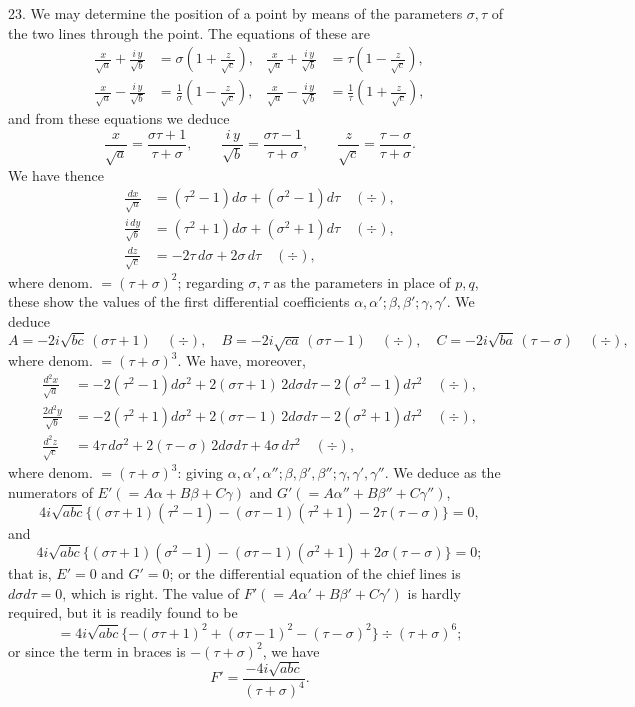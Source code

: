 \documentclass[11pt,a4paper]{article}
\newcommand{\divmark}{\quad(\div)}
\begin{document}
23. We may determine the position of a point by means of the parameters $\sigma,\tau$
of the two lines through the point. The equations of these are
\[
\begin{aligned}
 \frac{x}{\sqrt a}+\frac{i\,y}{\sqrt b}
 &=\sigma\left(1+\frac{z}{\sqrt c}\right),&
 \frac{x}{\sqrt a}+\frac{i\,y}{\sqrt b}
 &=\tau\left(1-\frac{z}{\sqrt c}\right),\\
 \frac{x}{\sqrt a}-\frac{i\,y}{\sqrt b}
 &=\frac{1}{\sigma}\left(1-\frac{z}{\sqrt c}\right),&
 \frac{x}{\sqrt a}-\frac{i\,y}{\sqrt b}
 &=\frac{1}{\tau}\left(1+\frac{z}{\sqrt c}\right),
\end{aligned}
\]
and from these equations we deduce
\[
 \frac{x}{\sqrt a}=\frac{\sigma\tau+1}{\tau+\sigma},\qquad
 \frac{i\,y}{\sqrt b}=\frac{\sigma\tau-1}{\tau+\sigma},\qquad
 \frac{z}{\sqrt c}=\frac{\tau-\sigma}{\tau+\sigma}.
\]
We have thence
\[
\begin{aligned}
 \frac{dx}{\sqrt a}&=(\tau^2-1)d\sigma+(\sigma^2-1)d\tau \divmark,\\
 \frac{i\,dy}{\sqrt b}&=(\tau^2+1)d\sigma+(\sigma^2+1)d\tau \divmark,\\
 \frac{dz}{\sqrt c}&=-2\tau\,d\sigma+2\sigma\,d\tau \divmark,
\end{aligned}
\]
where denom. $=(\tau+\sigma)^2$; regarding $\sigma,\tau$ as the parameters in place of
$p,q$, these show the values of the first differential coefficients
$\alpha,\alpha';\beta,\beta';\gamma,\gamma'$. We deduce
\[
 A=-2i\sqrt{bc}\,(\sigma\tau+1)\divmark,\quad
 B=-2i\sqrt{ca}\,(\sigma\tau-1)\divmark,\quad
 C=-2i\sqrt{ba}\,(\tau-\sigma)\divmark,
\]
where denom. $=(\tau+\sigma)^3$. We have, moreover,
\[
\begin{aligned}
 \frac{d^2x}{\sqrt a}&=-2(\tau^2-1)d\sigma^2+2(\sigma\tau+1)\,2d\sigma d\tau
 -2(\sigma^2-1)d\tau^2\divmark,\\
 \frac{2d^2y}{\sqrt b}&=-2(\tau^2+1)d\sigma^2+2(\sigma\tau-1)\,2d\sigma d\tau
 -2(\sigma^2+1)d\tau^2\divmark,\\
 \frac{d^2z}{\sqrt c}&=4\tau\,d\sigma^2+2(\tau-\sigma)\,2d\sigma d\tau
 +4\sigma\,d\tau^2\divmark,
\end{aligned}
\]
where denom. $=(\tau+\sigma)^3$: giving $\alpha,\alpha',\alpha'';\beta,\beta',\beta'';
\gamma,\gamma',\gamma''$. We deduce as the numerators of
$E'(=A\alpha+B\beta+C\gamma)$ and $G'(=A\alpha''+B\beta''+C\gamma'')$,
\[
4i\sqrt{abc}\{(\sigma\tau+1)(\tau^2-1)-(\sigma\tau-1)(\tau^2+1)-2\tau(\tau-\sigma)\}=0,
\]
and
\[
4i\sqrt{abc}\{(\sigma\tau+1)(\sigma^2-1)-(\sigma\tau-1)(\sigma^2+1)
+2\sigma(\tau-\sigma)\}=0;
\]
that is, $E'=0$ and $G'=0$; or the differential equation of the chief lines is
$d\sigma d\tau=0$, which is right. The value of $F'(=A\alpha'+B\beta'+C\gamma')$
is hardly required, but it is readily found to be
\[
 =4i\sqrt{abc}\{-(\sigma\tau+1)^2+(\sigma\tau-1)^2-(\tau-\sigma)^2\}\div(\tau+\sigma)^6;
\]
or since the term in braces is $-(\tau+\sigma)^2$, we have
\[
 F'=\frac{-4i\sqrt{abc}}{(\tau+\sigma)^4}.
\]
\end{document}
